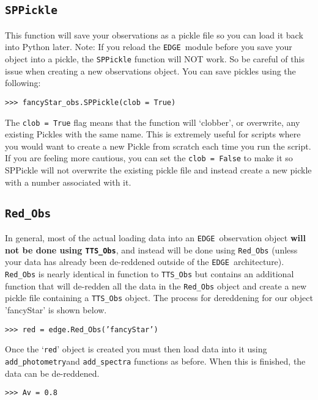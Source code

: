 \documentclass{emulateapj}
\newcommand{\edge}{\texttt{EDGE }}
\begin{document}
\subsection{\texttt{SPPickle}}
 
This function will save your observations as a pickle file so you can load it back into Python later. Note: If you reload the \edge module before you save your object into a pickle, the \texttt{SPPickle} function will NOT work. So be careful of this issue when creating a new observations object. You can save pickles using the following:

\vspace{2mm}
\texttt{>>> fancyStar\_obs.SPPickle(clob = True)}
\vspace{2mm}

The \texttt{clob = True} flag means that the function will `clobber', or overwrite, any existing Pickles with the same name. This is extremely useful for scripts where you would want to create a new Pickle from scratch each time you run the script. If you are feeling more cautious, you can set the \texttt{clob = False} to make it so SPPickle will not overwrite the existing pickle file and instead create a new pickle with a number associated with it.

\subsection{\texttt{Red\_Obs}}

In general, most of the actual loading data into an \edge observation object \textbf{will not be done using \texttt{TTS\_Obs}}, and instead will be done using \texttt{Red\_Obs} (unless your data has already been de-reddened outside of the \edge architecture). \texttt{Red\_Obs} is nearly identical in function to \texttt{TTS\_Obs} but contains an additional function that will de-redden all the data in the \texttt{Red\_Obs} object and create a new pickle file containing a \texttt{TTS\_Obs} object.
The process for dereddening for our object 'fancyStar' is shown below.

\vspace{2mm}
\texttt{>>> red =  edge.Red\_Obs('fancyStar')}
\vspace{2mm}

Once the `\texttt{red}' object is created you must then load data into it using \texttt{add\_photometry}and \texttt{add\_spectra} functions as before. When this is finished, the data can be de-reddened.

\vspace{2mm}
\texttt{>>> Av = 0.8}
\end{document}

